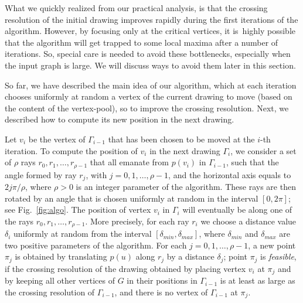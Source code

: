 \documentclass[runningheads]{llncs}
\begin{document}
What we quickly realized from our practical analysis, is that the crossing resolution of the initial drawing improves rapidly during the first iterations of the algorithm. However, by focusing only at the critical vertices, it is~highly possible that the algorithm will get trapped to some local maxima after a number of iterations. So, special care is needed to avoid these bottlenecks, especially when the input graph is large. We will discuss ways to avoid them later in this section.

So far, we have described the main idea of our algorithm, which at each iteration chooses uniformly at random a vertex of the current drawing to move (based on the content of the vertex-pool), so to improve the crossing resolution. Next, we  described how to compute its new position in the next drawing.

Let $v_i$ be the vertex of $\Gamma_{i-1}$ that has been chosen to be moved at the $i$-th iteration.
To compute the position of $v_i$ in the next drawing $\Gamma_i$, we consider a set of $\rho$ rays $r_0,r_1,\ldots,r_{\rho-1}$ that all emanate from $p(v_i)$ in $\Gamma_{i-1}$, such that the angle formed by ray $r_j$, with $j=0,1,\ldots,\rho-1$, and the horizontal axis equals to $2j\pi/\rho$, where $\rho>0$ is an integer parameter of the algorithm. These rays are then rotated by an angle that is chosen uniformly at random in the interval $[0,2\pi]$; see Fig.~\ref{fig:algo}. The position of vertex $v_i$ in $\Gamma_i$ will eventually be along one of the rays $r_0,r_1,\ldots,r_{\rho-1}$. More precisely, for each ray $r_i$ we choose a distance value $\delta_i$ uniformly at random from the interval $[\delta_{min},\delta_{max}]$, where $\delta_{min}$ and $\delta_{max}$ are two positive parameters of the algorithm. For each $j=0,1,\ldots,\rho-1$, a new point $\pi_j$ is obtained by translating $p(u)$ along $r_j$ by a distance $\delta_j$; point $\pi_j$ is \emph{feasible}, if the crossing resolution of the drawing obtained by placing vertex $v_i$ at $\pi_j$ and by keeping all other vertices of $G$ in their positions in $\Gamma_{i-1}$ is at least as large as the crossing resolution of $\Gamma_{i-1}$, and there is no vertex of $\Gamma_{i-1}$ at $\pi_j$.
\end{document}
